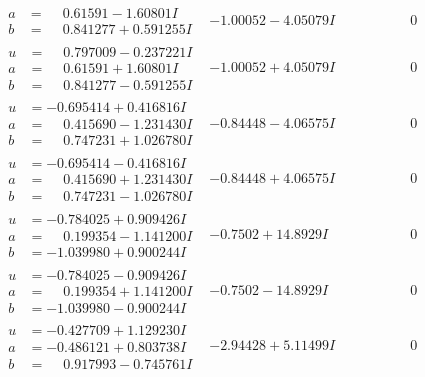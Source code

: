 \documentclass[1p]{elsarticle_modified}
\theoremstyle{definition}
\begin{document}
$$\begin{array}{c|c|c}
\begin{aligned}
a &= \phantom{-}0.61591 - 1.60801 I \\
b &= \phantom{-}0.841277 + 0.591255 I\end{aligned}
 & -1.00052 - 4.05079 I & \phantom{-0.000000 } 0 \\ \hline\begin{aligned}
u &= \phantom{-}0.797009 - 0.237221 I \\
a &= \phantom{-}0.61591 + 1.60801 I \\
b &= \phantom{-}0.841277 - 0.591255 I\end{aligned}
 & -1.00052 + 4.05079 I & \phantom{-0.000000 } 0 \\ \hline\begin{aligned}
u &= -0.695414 + 0.416816 I \\
a &= \phantom{-}0.415690 - 1.231430 I \\
b &= \phantom{-}0.747231 + 1.026780 I\end{aligned}
 & -0.84448 - 4.06575 I & \phantom{-0.000000 } 0 \\ \hline\begin{aligned}
u &= -0.695414 - 0.416816 I \\
a &= \phantom{-}0.415690 + 1.231430 I \\
b &= \phantom{-}0.747231 - 1.026780 I\end{aligned}
 & -0.84448 + 4.06575 I & \phantom{-0.000000 } 0 \\ \hline\begin{aligned}
u &= -0.784025 + 0.909426 I \\
a &= \phantom{-}0.199354 - 1.141200 I \\
b &= -1.039980 + 0.900244 I\end{aligned}
 & -0.7502 + 14.8929 I & \phantom{-0.000000 } 0 \\ \hline\begin{aligned}
u &= -0.784025 - 0.909426 I \\
a &= \phantom{-}0.199354 + 1.141200 I \\
b &= -1.039980 - 0.900244 I\end{aligned}
 & -0.7502 - 14.8929 I & \phantom{-0.000000 } 0 \\ \hline\begin{aligned}
u &= -0.427709 + 1.129230 I \\
a &= -0.486121 + 0.803738 I \\
b &= \phantom{-}0.917993 - 0.745761 I\end{aligned}
 & -2.94428 + 5.11499 I & \phantom{-0.000000 } 0 \\ \hline\begin{aligned}

\end{aligned}
\end{array}$$
\end{document}
